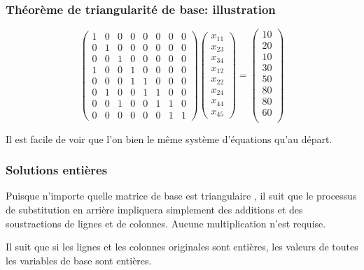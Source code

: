 \documentclass[usepdftitle=false]{beamer}
\begin{document}
\begin{frame}
\frametitle{Théorème de triangularité de base: illustration}

\[
\begin{pmatrix}
 1 & 0 & 0 & 0 & 0 & 0 & 0 & 0 \\
 0 & 1 & 0 & 0 & 0 & 0 & 0 & 0 \\
 0 & 0 & 1 & 0 & 0 & 0 & 0 & 0 \\
 1 & 0 & 0 & 1 & 0 & 0 & 0 & 0 \\
 0 & 0 & 0 & 1 & 1 & 0 & 0 & 0 \\
 0 & 1 & 0 & 0 & 1 & 1 & 0 & 0 \\
 0 & 0 & 1 & 0 & 0 & 1 & 1 & 0 \\
 0 & 0 & 0 & 0 & 0 & 0 & 1 & 1
\end{pmatrix}
\begin{pmatrix}
x_{11} \\
x_{23} \\
x_{34} \\
x_{12} \\
x_{22} \\
x_{24} \\
x_{44} \\
x_{45}
\end{pmatrix}
=
\begin{pmatrix}
10 \\
20 \\
10 \\
30 \\
50 \\
80 \\
80 \\
60 \\
\end{pmatrix}
\]

Il est facile de voir que l'on bien le même système d'équations qu'au départ.

\end{frame}

\begin{frame}
\frametitle{Solutions entières}

Puisque n'importe quelle matrice de base est triangulaire , il suit que le processus de substitution en arrière impliquera simplement des additions et des soustractions de lignes et de colonnes. Aucune multiplication n'est requise.

\mbox{}

Il suit que si les lignes et les colonnes originales sont entières, les valeurs de toutes les variables de base sont entières.

\end{frame}
\end{document}
